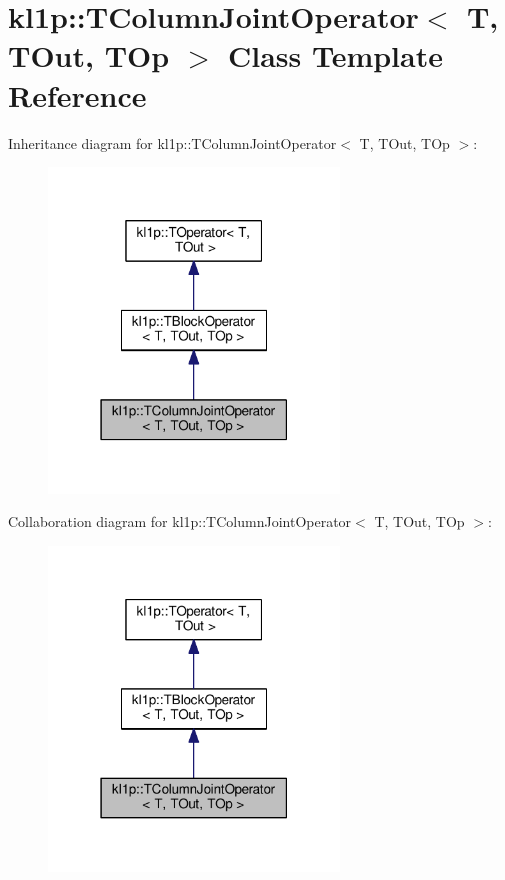 \hypertarget{classkl1p_1_1TColumnJointOperator}{}\section{kl1p\+:\+:T\+Column\+Joint\+Operator$<$ T, T\+Out, T\+Op $>$ Class Template Reference}
\label{classkl1p_1_1TColumnJointOperator}


Inheritance diagram for kl1p\+:\+:T\+Column\+Joint\+Operator$<$ T, T\+Out, T\+Op $>$\+:
\nopagebreak
\begin{figure}[H]
\begin{center}
\leavevmode
\includegraphics[width=219pt]{classkl1p_1_1TColumnJointOperator__inherit__graph}
\end{center}
\end{figure}


Collaboration diagram for kl1p\+:\+:T\+Column\+Joint\+Operator$<$ T, T\+Out, T\+Op $>$\+:
\nopagebreak
\begin{figure}[H]
\begin{center}
\leavevmode
\includegraphics[width=219pt]{classkl1p_1_1TColumnJointOperator__coll__graph}
\end{center}
\end{figure}
